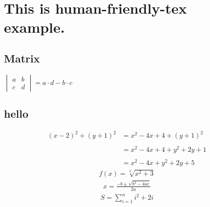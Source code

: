 \documentclass{article}
\begin{document}
        \section{This is human-friendly-tex example.}\subsection{Matrix}$\begin{vmatrix}a&b\\c&d\end{vmatrix}= a\cdot d - b\cdot c$\subsection{hello}\begin{align*}(x-2)^2+(y+1)^2&= x^2-4x+4+(y+1)^2 \\\\&= x^2-4x+4+y^2+2y+1 \\\\&= x^2-4x+y^2+2y+5\end{align*}\begin{align*}f(x)=\sqrt[3]{x^2+3}\end{align*}\begin{align*}x=\frac{-b \pm \sqrt{b^2-4ac}}{2a}\end{align*}\begin{align*}S=\sum_{i=1}^{n} i^2+2i\end{align*}
        
\end{document}
